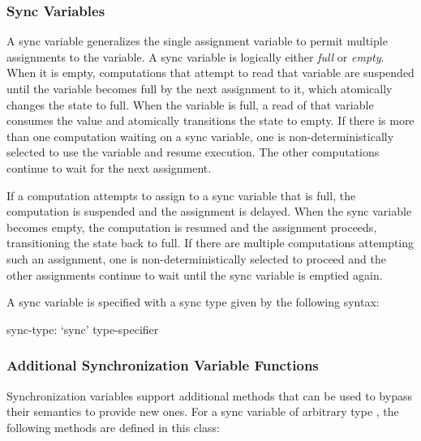 \subsubsection{Sync Variables}
\label{Sync_Variables}

A sync variable generalizes the single assignment variable to permit
multiple assignments to the variable. A sync variable is logically
either {\em full} or {\em empty}. When it is empty, computations that
attempt to read that variable are suspended until the variable becomes
full by the next assignment to it, which atomically changes the state
to full. When the variable is full, a read of that variable consumes
the value and atomically transitions the state to empty. If there is
more than one computation waiting on a sync variable, one is
non-deterministically selected to use the variable and resume
execution.  The other computations continue to wait for the next
assignment.

If a computation attempts to assign to a sync variable that is full,
the computation is suspended and the assignment is delayed. When the
sync variable becomes empty, the computation is resumed and the
assignment proceeds, transitioning the state back to full. If there
are multiple computations attempting such an assignment, one is
non-deterministically selected to proceed and the other assignments
continue to wait until the sync variable is emptied again.

A sync variable is specified with a sync type given by the following
syntax:
\begin{syntax}
sync-type:
  `sync' type-specifier
\end{syntax}

\subsubsection{Additional Synchronization Variable Functions}
\label{Functions_on_Synchronization_Variables}

Synchronization variables support additional methods that
can be used to bypass their semantics to provide new ones.
For a sync variable  of arbitrary type ,
the following methods are defined in this class:

